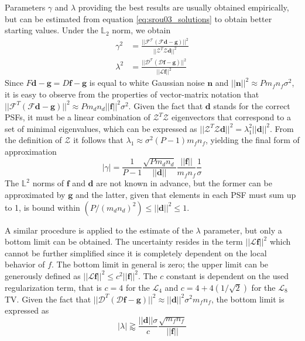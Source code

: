 \documentclass[12pt,notitlepage]{report}
\begin{document}
Parameters $\gamma$ and $\lambda$ providing the best results are usually obtained empirically, but can be estimated from equation \ref{eq:srou03_solutions} to obtain better starting values. Under the $\mathbb{L}_2$ norm, we obtain
\begin{equation}
\label{eq:srou03_gamma_lambda}
	\begin{aligned}
		\gamma^2  &= \frac{ ||\mathcal{F}^\mathcal{T}(\mathcal{F} \mathbf{d} - \mathbf{g}) ||^2 }{ || \mathcal{Z}^T \mathcal{Z} \mathbf{d} ||^2} \\
		\lambda^2 &= \frac{ ||\mathcal{D}^\mathcal{T}(\mathcal{D} \mathbf{f} - \mathbf{g}) ||^2 }{ || \mathcal{L}   \mathbf {f} ||^2}   	
	\end{aligned}
\end{equation}
Since $F \mathbf{d} - \mathbf{g} = D \mathbf{f} - \mathbf{g}$ is equal to white Gaussian noise $\mathbf{n}$ and $||\mathbf{n}||^2 \approx P m_f n_f \sigma^2$, it is easy to observe from the properties of vector-matrix notation that $||\mathcal{F}^T(\mathcal{F} \mathbf{d} - \mathbf{g}) ||^2 \approx P m_d n_d ||\mathbf{f}||^2 \sigma^2$. Given the fact that $\mathbf{d}$ stands for the correct PSFs, it must be a linear combination of $\mathcal{Z}^T \mathcal{Z} $ eigenvectors that correspond to a set of minimal eigenvalues, which can be expressed as $||\mathcal{Z}^T \mathcal{Z} \mathbf{d}||^2 = \lambda_1^2 ||\mathbf{d}||^2$. From the definition of $\mathcal{Z}$ it follows that $\lambda_1 \approx \sigma^2 (P-1) m_f n_f$, yielding the final form of approximation 
\begin{equation}
\label{eq:srou03_gamma_estimate}
	|\gamma| = \frac{1}{P - 1} \frac{\sqrt{P m_d n_d}}{|| \mathbf{d} ||} \frac{||\mathbf{f}||}{m_f n_f} \frac{1}{\sigma}
\end{equation}
The $\mathbb{L}^2$ norms of $\mathbf{f}$ and $\mathbf{d}$ are not known in advance, but the former can be approximated by $\mathbf{g}$ and the latter, given that elements in each PSF must sum up to 1, is bound within $(P / (m_d n_d)^2) \leq || \mathbf{d} ||^2 \leq 1$. 

A similar procedure is applied to the estimate of the $\lambda$ parameter, but only a bottom limit can be obtained. The uncertainty resides in the term $||\mathcal{L} \mathbf{f}||^2$ which cannot be further simplified since it is completely dependent on the local behavior of $f$. The bottom limit in general is zero; the upper limit can be generously defined as $||\mathcal{L} \mathbf{f}||^2 \leq c^2 ||\mathbf{f}||^2$. The $c$ constant is dependent on the used regularization term, that is $c = 4$ for the $\mathcal{L}_4$ and $c = 4 + 4(1/\sqrt{2})$ for the $\mathcal{L}_8$ TV. Given the fact that $||\mathcal{D}^T (\mathcal{D} \mathbf{f} - \mathbf{g}) ||^2 \approx || \mathbf{d} ||^2 \sigma^2 m_f n_f$, the bottom limit is expressed as
\begin{equation}
\label{eq:srou03_lambda_estimate}
	|\lambda| \gtrapprox \frac{||\mathbf{d}||\sigma}{c} \frac{\sqrt{m_f n_f}}{||\mathbf{f}||}
\end{equation}
\end{document}
